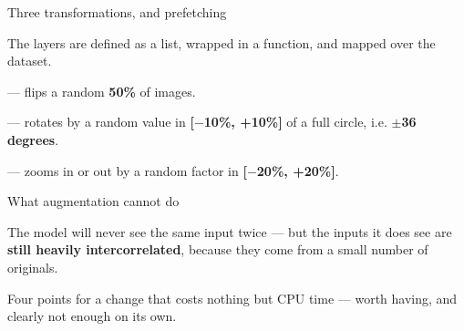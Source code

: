 \documentclass[aspectratio=169,11pt,t]{beamer}
\begin{document}
\begin{frame}[shrink=25]{Three transformations, and prefetching}
{\fontsize{9.4}{12.6}\selectfont\color{fg2}The layers are defined as a list, wrapped in a function, and mapped over the dataset.\par}\vskip 4pt
\begin{ibullets}
\item {} --- flips a random \textbf{50\%} of images.
\item {} --- rotates by a random value in \textbf{[$-$10\%, +10\%]} of a full circle, i.e. \textbf{$\pm$36 degrees}.
\item {} --- zooms in or out by a random factor in \textbf{[$-$20\%, +20\%]}.
\end{ibullets}
\end{frame}

\begin{frame}{What augmentation cannot do}
\begin{iband}[amber]
The model will never see the same input twice --- but the inputs it does see are \textbf{still heavily intercorrelated}, because they come from a small number of originals. 
\end{iband}
\begin{minipage}[t]{0.494\textwidth}
\end{minipage}%
\hfill
\begin{minipage}[t]{0.494\textwidth}
\end{minipage}%
{\fontsize{9.4}{12.6}\selectfont\color{fg2}Four points for a change that costs nothing but CPU time --- worth having, and clearly not enough on its own.\par}\vskip 4pt
\end{frame}

\end{document}
